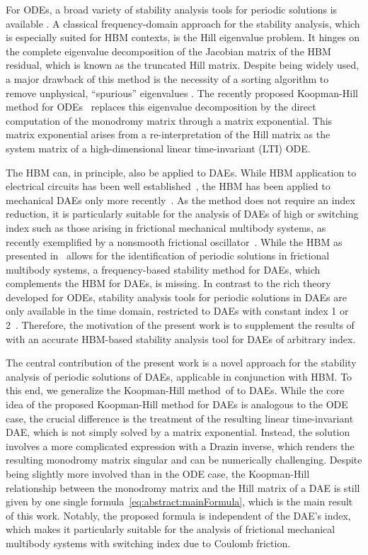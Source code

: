 \documentclass[a4paper, nonatbib, 3p, twocolumn]{elsarticle}
\theoremstyle{plain}
\theoremstyle{definition}
\theoremstyle{remark}
\begin{document}
For ODEs, a broad variety of stability analysis tools for periodic solutions is available \cite{LaSalle1968, Verhulst2006, Peletan2013}. A classical frequency-domain approach for the stability analysis, which is especially suited for HBM contexts, is the Hill eigenvalue problem\cite{Lazarus2010,Zhou2004}. It hinges on the complete eigenvalue decomposition of the Jacobian matrix of the HBM residual, which is known as the truncated Hill matrix. Despite being widely used, a major drawback of this method is the necessity of a sorting algorithm to remove unphysical, ``spurious'' eigenvalues \cite{Wu2022}. The recently proposed Koopman-Hill method for ODEs~\cite{Bayer2023,Bayer2024a,Bayer2025} replaces this eigenvalue decomposition by the direct computation of the monodromy matrix through a matrix exponential. This matrix exponential arises from a re-interpretation of the Hill matrix as the system matrix of a high-dimensional linear time-invariant (LTI) ODE.

The HBM can, in principle, also be applied to DAEs. While HBM application to electrical circuits has been well established~\cite{Gilmore1991}, the HBM has been applied to mechanical DAEs only more recently~\cite{Ju2021, Cochelin2009}. As the method does not require an index reduction, it is particularly suitable for the analysis of DAEs of high or switching index such as those arising in frictional mechanical multibody systems, as recently exemplified by a nonsmooth frictional oscillator~\cite{Legrand2024,Hashemi2025}. While the HBM as presented in~\cite{Legrand2024} allows for the identification of periodic solutions in frictional multibody systems, a frequency-based stability method for DAEs, which complements the HBM for DAEs, is missing. In contrast to the rich theory developed for ODEs, stability analysis tools for periodic solutions in DAEs are only available in the time domain, restricted to DAEs with constant index 1 or 2~\cite{Lamour1998, Lamour2003}. Therefore, the motivation of the present work is to supplement the results of~\cite{Legrand2024} with an accurate HBM-based stability analysis tool for DAEs of arbitrary index.

The central contribution of the present work is a novel approach for the stability analysis of periodic solutions of DAEs, applicable in conjunction with HBM. To this end, we generalize the Koopman-Hill method~of \cite{Bayer2023,Bayer2024a,Bayer2025} to DAEs. While the core idea of the proposed Koopman-Hill method for DAEs is analogous to the ODE case, the crucial difference is the treatment of the resulting linear time-invariant DAE, which is not simply solved by a matrix exponential. Instead, the solution involves a more complicated expression with a Drazin inverse, which renders the resulting monodromy matrix singular and can be numerically challenging. Despite being slightly more involved than in the ODE case, the Koopman-Hill relationship between the monodromy matrix and the Hill matrix of a DAE is still given by one single formula~\eqref{eq:abstract:mainFormula}, which is the main result of this work. Notably, the proposed formula is independent of the DAE's index, which makes it particularly suitable for the analysis of frictional mechanical multibody systems with switching index due to Coulomb friction.
\end{document}
